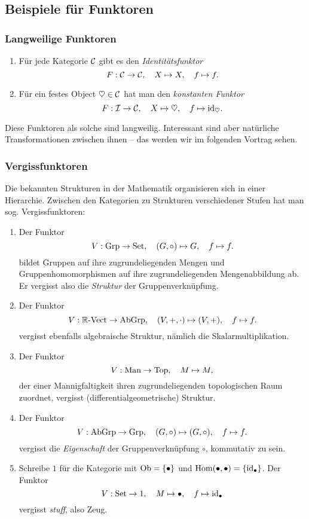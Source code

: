 \subsection{Beispiele für Funktoren}

\subsubsection{Langweilige Funktoren}

\begin{enumerate}
  \item Für jede Kategorie $\mathcal{C}$ gibt es den \emph{Identitätsfunktor}
  \[ F : \mathcal{C} \to \mathcal{C}, \quad X \mapsto X, \quad f \mapsto f. \]
  \item Für ein festes Object $\heartsuit \in \mathcal{C}$ hat man den \emph{konstanten Funktor}
  \[ F : \mathcal{I} \to \mathcal{C}, \quad X \mapsto \heartsuit, \quad f \mapsto \mathrm{id}_\heartsuit. \]
\end{enumerate}

Diese Funktoren als solche sind langweilig. Interessant sind aber natürliche
Transformationen zwischen ihnen -- das werden wir im folgenden Vortrag sehen.


\subsubsection{Vergissfunktoren}

Die bekannten Strukturen in der Mathematik organisieren sich in einer
Hierarchie. Zwischen den Kategorien zu Strukturen verschiedener Stufen hat man sog.
Vergissfunktoren:

\begin{enumerate}
  \item Der Funktor
  \[ V : \mathrm{Grp} \to \mathrm{Set}, \quad (G,\circ) \mapsto G, \quad f \mapsto f. \]
  bildet Gruppen auf ihre zugrundeliegenden Mengen und Gruppenhomomorphismen
  auf ihre zugrundeliegenden Mengenabbildung ab. Er vergisst also die
  \emph{Struktur} der Gruppenverknüpfung.
  \item Der Funktor
  \[ V : {\mathbb{R}\text{-}\mathrm{Vect}} \to \mathrm{AbGrp}, \quad (V,+,\cdot) \mapsto (V,+), \quad f \mapsto f. \]
  vergisst ebenfalls algebraische Struktur, nämlich die Skalarmultiplikation.
  \item Der Funktor
  \[ V : \mathrm{Man} \to \mathrm{Top}, \quad M \mapsto M, \]
  der einer Mannigfaltigkeit ihren zugrundeliegenden topologischen Raum
  zuordnet, vergisst (differentialgeometrische) Struktur.
  \item Der Funktor
  \[ V : \mathrm{AbGrp} \to \mathrm{Grp}, \quad (G,\circ) \mapsto (G,\circ), \quad f \mapsto f. \]
  vergisst die \emph{Eigenschaft} der Gruppenverknüpfung $\circ$, kommutativ zu sein.
  \item Schreibe $1$ für die Kategorie mit $\operatorname{Ob} = \lbrace \bullet \rbrace$ und $\mathrm{Hom}(\bullet,\bullet) = \lbrace \mathrm{id}_\bullet \rbrace$. Der Funktor
  \[ V : \mathrm{Set} \to 1, \quad M \mapsto \bullet, \quad f \mapsto \mathrm{id}_\bullet \]
  vergisst \emph{stuff}, also Zeug.
\end{enumerate}

